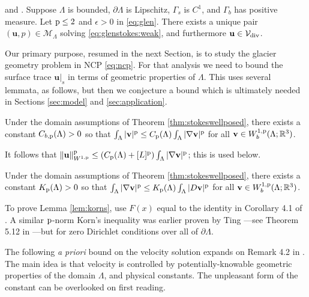 \documentclass[hidelinks,onefignum,onetabnum,final]{siamart220329}  %
\newcommand{\eps}{\epsilon}
\newcommand{\RR}{\mathbb{R}}
\newcommand{\grad}{\nabla}
\newcommand{\bu}{\mathbf{u}}
\newcommand{\bv}{\mathbf{v}}
\newcommand{\cV}{\mathcal{V}}
\newcommand{\pp}{{\text{\textnormal{p}}}}
\newcommand{\Vdiv}{\cV_{\text{\textnormal{div}}}}
\begin{document}
\begin{theorem} \label{thm:stokeswellposed} \cite[Theorem 3.10]{JouvetRappaz2011} and \cite[Appendix A]{IsaacStadlerGhattas2015}.  Suppose $\Lambda$ is bounded, $\partial\Lambda$ is Lipschitz, $\Gamma_s$ is $C^1$, and $\Gamma_b$ has positive measure.  Let $\pp\le 2$ and $\eps>0$ in \eqref{eq:glen}.  There exists a unique pair $(\bu,p) \in \mathcal{M}_\Lambda$ solving \eqref{eq:glenstokes:weak}, and furthermore $\bu\in \Vdiv$.
\end{theorem}

Our primary purpose, resumed in the next Section, is to study the glacier geometry problem in NCP \eqref{eq:ncp}.  For that analysis we need to bound the surface trace $\bu|_s$ in terms of geometric properties of $\Lambda$.  This uses several lemmata, as follows, but then we conjecture a bound which is ultimately needed in Sections \ref{sec:model} and \ref{sec:application}.

\begin{lemma} \label{lem:poincare}
Under the domain assumptions of Theorem \ref{thm:stokeswellposed}, there exists a constant $C_{b,\pp}(\Lambda)>0$ so that $\int_\Lambda |\bv|^\pp \le C_{\pp}(\Lambda) \int_\Lambda |\grad\bv|^\pp$ for all $\bv \in W_b^{1,\pp}(\Lambda; \RR^3)$.
\end{lemma}

It follows that $\|\bu\|_{W^{1,\pp}}^\pp \le \left(C_{\pp}(\Lambda) + [L]^\pp\right) \int_\Lambda |\grad\bv|^\pp$; this is used below.

\begin{lemma} \label{lem:korns}
Under the domain assumptions of Theorem \ref{thm:stokeswellposed}, there exists a constant $K_{\pp}(\Lambda)>0$ so that $\int_\Lambda |\grad\bv|^\pp \le K_{\pp}(\Lambda) \int_\Lambda |D\bv|^\pp$ for all $\bv \in W_b^{1,\pp}(\Lambda; \RR^3)$.
\end{lemma}

To prove Lemma \ref{lem:korns}, use $F(x)$ equal to the identity in Corollary 4.1 of \cite{Pompe2003}.  A similar $\pp$-norm Korn's inequality was earlier proven by Ting \cite{Ting1972}---see Theorem 5.12 in \cite{KikuchiOden1988}---but for zero Dirichlet conditions over all of $\partial \Lambda$.

The following \emph{a priori} bound on the velocity solution expands on Remark 4.2 in \cite{JouvetRappaz2011}.  The main idea is that velocity is controlled by potentially-knowable geometric properties of the domain $\Lambda$, and physical constants.  The unpleasant form of the constant can be overlooked on first reading.
\end{document}

